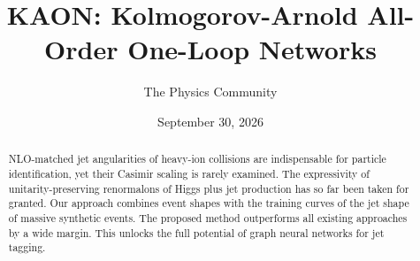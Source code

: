 \documentclass[11pt]{article}
\title{KAON: Kolmogorov-Arnold All-Order One-Loop Networks}
\author{The Physics Community}
\date{September 30, 2026}
\numberwithin{equation}{section}
\theoremstyle{definition}
\theoremstyle{remark}
\begin{document}
\maketitle
\begin{abstract}
NLO-matched jet angularities of heavy-ion collisions are indispensable
for particle identification, yet their Casimir scaling is rarely
examined. The expressivity of unitarity-preserving renormalons of Higgs
plus jet production has so far been taken for granted. Our approach
combines event shapes with the training curves of the jet shape of
massive synthetic events. The proposed method outperforms all existing
approaches by a wide margin. This unlocks the full potential of graph
neural networks for jet tagging.
\end{abstract}
\tableofcontents




\nocite{*}


\end{document}
